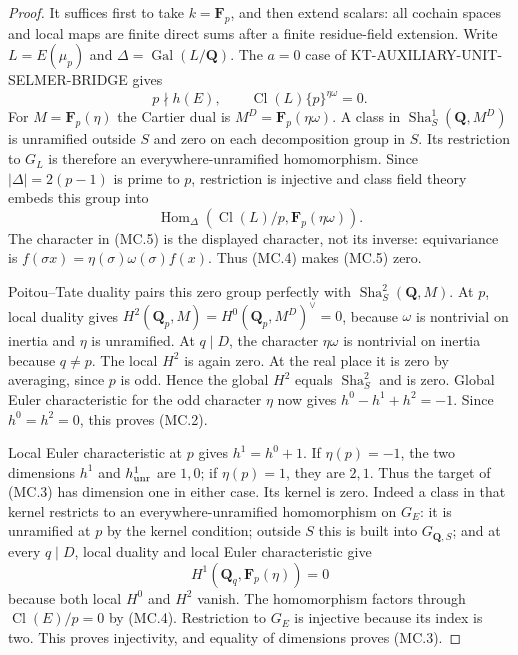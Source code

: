 \documentclass[11pt,a4paper]{article}
\theoremstyle{definition}
\newcommand{\Sha}{\operatorname{Sha}}
\begin{document}
\begin{proof}
It suffices first to take $k=\mathbf F_p$, and then extend
scalars: all cochain spaces and local maps are finite direct
sums after a finite residue-field extension.
Write $L=E(\mu_p)$ and $\Delta=\operatorname{Gal}(L/\mathbf Q)$.
The $a=0$ case of KT-AUXILIARY-UNIT-SELMER-BRIDGE gives
\[
              p\nmid h(E),\qquad
              \operatorname{Cl}(L)\{p\}^{\eta\omega}=0.
                                                               \tag{MC.4}
\]
For $M=\mathbf F_p(\eta)$ the Cartier dual is
$M^D=\mathbf F_p(\eta\omega)$.
A class in $\Sha^1_S(\mathbf Q,M^D)$ is unramified outside
$S$ and zero on each decomposition group in $S$.
Its restriction to $G_L$ is therefore an everywhere-unramified
homomorphism.  Since $|\Delta|=2(p-1)$ is prime to $p$,
restriction is injective and class field theory embeds this
group into
\[
   \operatorname{Hom}_\Delta
       (\operatorname{Cl}(L)/p,\mathbf F_p(\eta\omega)).  \tag{MC.5}
\]
The character in (MC.5) is the displayed character, not its
inverse: equivariance is $f(\sigma x)=\eta(\sigma)
\omega(\sigma)f(x)$.  Thus (MC.4) makes (MC.5) zero.

Poitou--Tate duality pairs this zero group perfectly with
$\Sha^2_S(\mathbf Q,M)$.  At $p$, local duality gives
$H^2(\mathbf Q_p,M)=H^0(\mathbf Q_p,M^D)^\vee=0$,
because $\omega$ is nontrivial on inertia and $\eta$ is
unramified.  At $q\mid D$, the character $\eta\omega$
is nontrivial on inertia because $q\ne p$.  The local
$H^2$ is again zero.  At the real place it is zero by
averaging, since $p$ is odd.  Hence the global $H^2$ equals
$\Sha^2_S$ and is zero.  Global Euler characteristic for
the odd character $\eta$ now gives
$h^0-h^1+h^2=-1$.  Since $h^0=h^2=0$, this proves (MC.2).

Local Euler characteristic at $p$ gives $h^1=h^0+1$.
If $\eta(p)=-1$, the two dimensions $h^1$ and
$h^1_{\rm unr}$ are $1,0$; if $\eta(p)=1$, they are $2,1$.
Thus the target of (MC.3) has dimension one in either case.
Its kernel is zero.  Indeed a class in that kernel restricts
to an everywhere-unramified homomorphism on $G_E$: it is
unramified at $p$ by the kernel condition; outside $S$ this
is built into $G_{\mathbf Q,S}$; and at every $q\mid D$,
local duality and local Euler characteristic give
\[
               H^1(\mathbf Q_q,\mathbf F_p(\eta))=0
                                                               \tag{MC.6}
\]
because both local $H^0$ and $H^2$ vanish.
The homomorphism factors through $\operatorname{Cl}(E)/p=0$
by (MC.4).  Restriction to $G_E$ is injective because its
index is two.  This proves injectivity, and equality of
dimensions proves (MC.3).
\end{proof}
\end{document}
